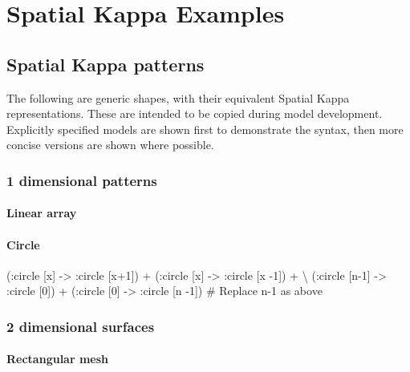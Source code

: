 \chapter{Spatial Kappa Examples}
\label{chap:resources}

\section{Spatial Kappa patterns}
\label{sec:spatialPatterns}

The following are generic shapes, with their equivalent Spatial Kappa representations. These are intended to be copied during model development. Explicitly specified models are shown first to demonstrate the syntax, then more concise versions are shown where possible.


\subsection{1 dimensional patterns}

\subsubsection{Linear array}

\begin{kappasource}
\end{kappasource}

\subsubsection{Circle}

\begin{kappasource}
    (:circle [x] -> :circle [x+1]) + (:circle [x] -> :circle [x -1]) + {\textbackslash}
    (:circle [n-1] -> :circle [0]) + (:circle [0] -> :circle [n -1]) # Replace n-1 as above
\end{kappasource}


\subsection{2 dimensional surfaces}

\subsubsection{Rectangular mesh}

